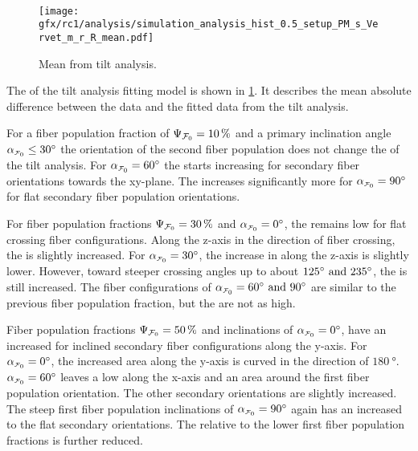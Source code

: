 \paragraph{\rvalue{}}
% 
\begin{figure}[!p]
\centering
\texttt{[image: gfx/rc1/analysis/simulation\_analysis\_hist\_0.5\_setup\_PM\_s\_Vervet\_m\_r\_R\_mean.pdf]}
\caption{Mean \rvalue{} from tilt analysis.}
\label{fig:sim_ana_rvalue}
\end{figure}
% 
The \rvalue{} of the tilt analysis fitting model is shown in \cref{fig:sim_ana_rvalue}.
It describes the mean absolute difference between the data and the fitted data from the tilt analysis.
\par
%
For a fiber population fraction of $\textnormal{$\Psi_{\textnormal{$\mathcal{F}_0$}}$}=\SI{10}{\percent}$ and a primary inclination angle $\modelInc\leq\SI{30}{\degree}$ the orientation of the second fiber population does not change the \rvalue{} of the tilt analysis.
For $\modelInc=\SI{60}{\degree}$ the \rvalue{} starts increasing for secondary fiber orientations towards the xy-plane.
The \rvalue{} increases significantly more for $\modelInc=\SI{90}{\degree}$ for flat secondary fiber population orientations.
\par
% 
For fiber population fractions $\textnormal{$\Psi_{\textnormal{$\mathcal{F}_0$}}$}=\SI{30}{\percent}$ and $\modelInc=\SI{0}{\degree}$, the \rvalue{} remains low for flat crossing fiber configurations.
Along the z-axis in the direction of fiber crossing, the \rvalue{} is slightly increased.
For $\modelInc=\SI{30}{\degree}$, the increase in \rvalue{} along the z-axis is slightly lower.
However, toward steeper crossing angles up to about $\SIlist{125;235}{\degree}$, the \rvalue{} is still increased.
The fiber configurations of $\modelInc=\SIlist{60;90}{\degree}$ are similar to the previous fiber population fraction, but the \rvalue{} are not as high.
\par
%
Fiber population fractions $\textnormal{$\Psi_{\textnormal{$\mathcal{F}_0$}}$}=\SI{50}{\percent}$ and inclinations of $\modelInc=\SI{0}{\degree}$, have an increased \rvalue{} for inclined secondary fiber configurations along the y-axis.
For $\modelInc=\SI{0}{\degree}$, the increased area along the y-axis is curved in the direction of $\SI{180}{\degree}$.
$\modelInc=\SI{60}{\degree}$ leaves a low \rvalue{} along the x-axis and an area around the first fiber population orientation.
The other secondary orientations are slightly increased.
The steep first fiber population inclinations of $\modelInc=\SI{90}{\degree}$ again has an increased \rvalue{} to the flat secondary orientations.
The \rvalue{} relative to the lower first fiber population fractions is further reduced.
